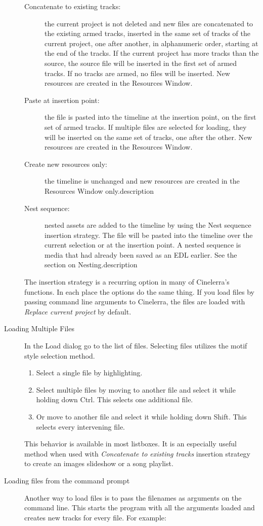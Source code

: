 \begin{description}
\begin{description}
        \item[Concatenate to existing tracks:]  the current project is not deleted and new files are concatenated to the existing armed tracks, inserted in the same set of tracks of the current project, one after another, in     alphanumeric order, starting at the end of the tracks. If the current project has more tracks than the source, the source file will be inserted in the first set of armed tracks. If no tracks are armed, no files will be inserted. New resources are created in the Resources Window.
        \item[Paste at insertion point:] the file is pasted into the timeline at the insertion point, on the first set of armed tracks.  If multiple files are selected for loading, they will be inserted on the same set of tracks, one after the other. New resources are created in the Resources Window.
        \item[Create new resources only:] the timeline is unchanged and new resources are created in the Resources Window only.description
        \item[Nest sequence:] nested assets are added to the timeline by using the Nest sequence insertion strategy.
        The file will be pasted into the timeline over the current selection or at the insertion point. A nested sequence is media that had already been saved as an EDL earlier.  See the section on Nesting.description
    \end{description}
    The insertion strategy is a recurring option in many of Cinelerra's functions. In each place the options do the same thing. If you load files by passing command line arguments to Cinelerra, the files are loaded with \textit{Replace current project} by default.
    \item[Loading Multiple Files] In the Load dialog go to the list of files. Selecting files utilizes the motif style selection method.
    \begin{enumerate} [noitemsep]
        \item Select a single file by highlighting.
        \item Select multiple files by moving to another file and select it while holding down Ctrl. This selects
        one additional file.
        \item Or move to another file and select it while holding down Shift. This selects every intervening file.
    \end{enumerate}
This behavior is available in most listboxes.   It is an especially useful method when used with \textit{Concatenate to existing tracks} insertion strategy to create an images slideshow or a song playlist.
    \item[Loading files from the command prompt] Another way to load files is to pass the filenames as arguments on the command line.  This starts the program with all the arguments loaded and creates new tracks for every file.  For example:
    

\end{description}
